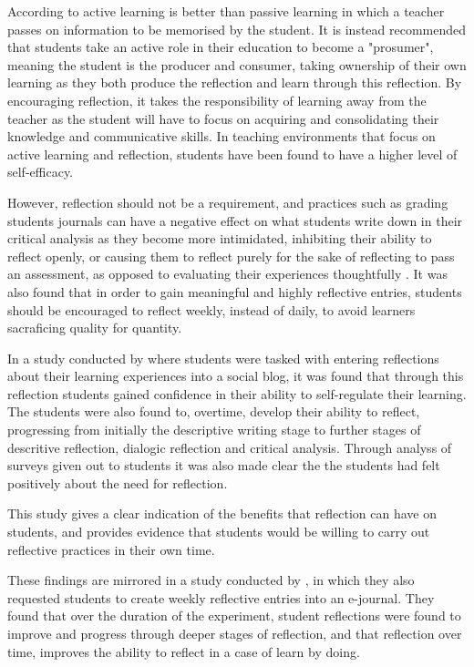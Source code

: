 \documentclass{l4proj}
\begin{document}
According to \citet{bruno_reflective_2018} active learning is better than passive learning in which a teacher passes on information to be memorised by the student. It is instead recommended that students take an active role in their education to become a "prosumer", meaning the student is the producer and consumer, taking ownership of their own learning as they both produce the reflection and learn through this reflection. By encouraging reflection, it takes the responsibility of learning away from the teacher as the student will have to focus on acquiring and consolidating their knowledge and communicative skills. In teaching environments that focus on active learning and reflection, students have been found to have a higher level of self-efficacy.

However, reflection should not be a requirement, and practices such as grading students journals can have a negative effect on what students write down in their critical analysis as they become more intimidated, inhibiting their ability to reflect openly, or causing them to reflect purely for the sake of reflecting to pass an assessment, as opposed to evaluating their experiences thoughtfully \citep{bruno_reflective_2018}. It was also found that in order to gain meaningful and highly reflective entries, students should be encouraged to reflect weekly, instead of daily, to avoid learners sacraficing quality for quantity.

In a study conducted by \citet{mcdermott_developing_nodate} where students were tasked with entering reflections about their learning experiences into a social blog, it was found that through this reflection students gained confidence in their ability to self-regulate their learning. The students were also found to, overtime, develop their ability to reflect, progressing from initially the descriptive writing stage to further stages of descritive reflection, dialogic reflection and critical analysis. Through analyss of surveys given out to students it was also made clear the the students had felt positively about the need for reflection.

This study gives a clear indication of the benefits that reflection can have on students, and provides evidence that students would be willing to carry out reflective practices in their own time.

These findings are mirrored in a study conducted by \citet{bruno_reflective_2018}, in which they also requested students to create weekly reflective entries into an e-journal. They found that over the duration of the experiment, student reflections were found to improve and progress through deeper stages of reflection, and that reflection over time, improves the ability to reflect in a case of learn by doing. 
\end{document}
